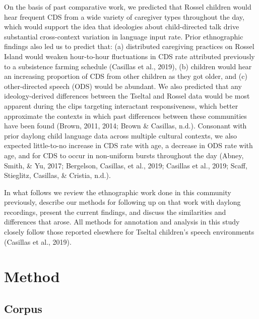 \documentclass[
  english,
  ,man,floatsintext]{apa6}
\begin{document}
On the basis of past comparative work, we predicted that Rossel children would hear frequent CDS from a wide variety of caregiver types throughout the day, which would support the idea that ideologies about child-directed talk drive substantial cross-context variation in language input rate. Prior ethnographic findings also led us to predict that: (a) distributed caregiving practices on Rossel Island would weaken hour-to-hour fluctuations in CDS rate attributed previously to a subsistence farming schedule (Casillas et al., 2019), (b) children would hear an increasing proportion of CDS from other children as they got older, and (c) other-directed speech (ODS) would be abundant. We also predicted that any ideology-derived differences between the Tseltal and Rossel data would be most apparent during the clips targeting interactant responsiveness, which better approximate the contexts in which past differences between these communities have been found (Brown, 2011, 2014; Brown \& Casillas, n.d.). Consonant with prior daylong child language data across multiple cultural contexts, we also expected little-to-no increase in CDS rate with age, a decrease in ODS rate with age, and for CDS to occur in non-uniform bursts throughout the day (Abney, Smith, \& Yu, 2017; Bergelson, Casillas, et al., 2019; Casillas et al., 2019; Scaff, Stieglitz, Casillas, \& Cristia, n.d.).

In what follows we review the ethnographic work done in this community previously, describe our methods for following up on that work with daylong recordings, present the current findings, and discuss the similarities and differences that arose. All methods for annotation and analysis in this study closely follow those reported elsewhere for Tseltal children's speech environments (Casillas et al., 2019).

\hypertarget{methods}{%
\section{Method}\label{methods}}

\hypertarget{methods-dataset}{%
\subsection{Corpus}\label{methods-dataset}}
\end{document}
